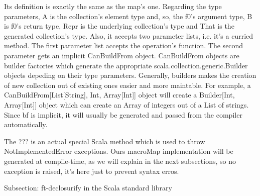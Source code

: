 Its definition is exactly the same as the map's one. Regarding the type
parameters, A is the collection's element type and, so, the f0's argument type,
B is f0's return type, Repr is the underlying collection's type and That is the
generated collection's type. Also, it accepts two parameter lists, i.e. it's a
curried method. The first parameter list accepts the operation's function. The
second parameter gets an implicit CanBuildFrom object. CanBuildFrom objects are
builder factories which generate the appropriate
scala.collection.generic.Builder objects depeding on their type parameters.
Generally, builders makes the creation of new collection out of existing ones
easier and more maintable. For example, a CanBuildFrom[List[String], Int,
Array[Int]] object will create a Builder[Int, Array[Int]] object which can
create an Array of integers out of a List of strings. Since bf is implicit, it
will usually be generated and passed from the compiler automatically.

The ??? is an actual special Scala method which is used to throw
NotImplementedError exceptions. Ours macroMap implementation will be generated
at compile-time, as we will explain in the next subsections, so no exception is
raised, it's here just to prevent syntax erros.


Subsection: ft-declosurify in the Scala standard library

